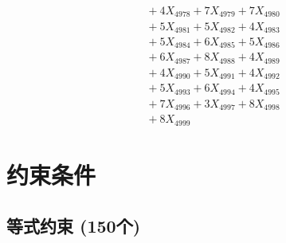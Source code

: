 \documentclass[a4paper,10pt]{article}
\begin{document}
{\begin{align}
&\;  + 4 X_{4978} + 7 X_{4979} + 7 X_{4980} \\[0.3ex]
&\;  + 5 X_{4981} + 5 X_{4982} + 4 X_{4983} \\[0.3ex]
&\;  + 5 X_{4984} + 6 X_{4985} + 5 X_{4986} \\[0.3ex]
&\;  + 6 X_{4987} + 8 X_{4988} + 4 X_{4989} \\[0.5ex]\allowbreak
&\;  + 4 X_{4990} + 5 X_{4991} + 4 X_{4992} \\[0.3ex]
&\;  + 5 X_{4993} + 6 X_{4994} + 4 X_{4995} \\[0.3ex]
&\;  + 7 X_{4996} + 3 X_{4997} + 8 X_{4998} \\[0.3ex]
&\;  + 8 X_{4999}\nonumber
\end{align}
}

\section{约束条件}

\subsection{等式约束 (150个)}
\end{document}
